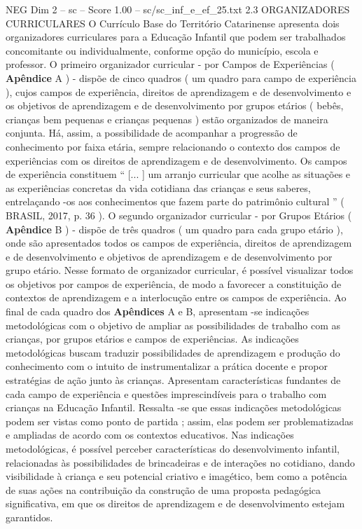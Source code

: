\begin{textsample}{NEG Dim 2 – sc – Score 1.00 – sc/sc\_inf\_e\_ef\_25.txt}  \label{ex:f2_neg_275}
2.3 ORGANIZADORES CURRICULARES O Currículo Base do Território Catarinense apresenta dois organizadores curriculares para a Educação Infantil que podem ser trabalhados concomitante ou individualmente, conforme opção do município, escola e professor.
O primeiro organizador curricular - por Campos de Experiências ( \textbf{Apêndice} A ) - dispõe de cinco quadros ( um quadro para campo de experiência ), cujos campos de experiência, direitos de aprendizagem e de desenvolvimento e os objetivos de aprendizagem e de desenvolvimento por grupos etários ( bebês, crianças bem pequenas e crianças pequenas ) estão organizados de maneira conjunta.
Há, assim, a possibilidade de acompanhar a progressão de conhecimento por faixa etária, sempre relacionando o contexto dos campos de experiências com os direitos de aprendizagem e de desenvolvimento.
Os campos de experiência constituem “ [... ] um arranjo curricular que acolhe as situações e as experiências concretas da vida cotidiana das crianças e seus saberes, entrelaçando -os aos conhecimentos que fazem parte do patrimônio cultural ” ( BRASIL, 2017, p. 36 ).
O segundo organizador curricular - por Grupos Etários ( \textbf{Apêndice} B ) - dispõe de três quadros ( um quadro para cada grupo etário ), onde são apresentados todos os campos de experiência, direitos de aprendizagem e de desenvolvimento e objetivos de aprendizagem e de desenvolvimento por grupo etário.
Nesse formato de organizador curricular, é possível visualizar todos os objetivos por campos de experiência, de modo a favorecer a constituição de contextos de aprendizagem e a interlocução entre os campos de experiência.
Ao final de cada quadro dos \textbf{Apêndices} A e B, apresentam -se indicações metodológicas com o objetivo de ampliar as possibilidades de trabalho com as crianças, por grupos etários e campos de experiências.
As indicações metodológicas buscam traduzir possibilidades de aprendizagem e produção do conhecimento com o intuito de instrumentalizar a prática docente e propor estratégias de ação junto às crianças.
Apresentam características fundantes de cada campo de experiência e questões imprescindíveis para o trabalho com crianças na Educação Infantil.
Ressalta -se que essas indicações metodológicas podem ser vistas como ponto de partida ; assim, elas podem ser problematizadas e ampliadas de acordo com os contextos educativos.
Nas indicações metodológicas, é possível perceber características do desenvolvimento infantil, relacionadas às possibilidades de brincadeiras e de interações no cotidiano, dando visibilidade à criança e seu potencial criativo e imagético, bem como a potência de suas ações na contribuição da construção de uma proposta pedagógica significativa, em que os direitos de aprendizagem e de desenvolvimento estejam garantidos.

\end{textsample}

